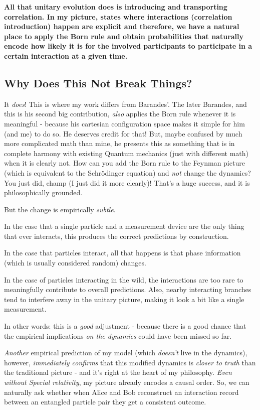 \documentclass{article}
\begin{document}
\textbf{All that unitary evolution does is introducing and transporting correlation. In my picture, states where interactions (correlation introduction) happen are explicit and therefore, we have a natural place to apply the Born rule and obtain probabilities that naturally encode how likely it is for the involved participants to participate in a certain interaction at a given time.}


\subsection{Why Does This Not Break Things?}

It \textit{does}! This is where my work differs from Barandes'. The later Barandes, and this is his second big contribution, \textit{also} applies the Born rule whenever it is meaningful - because his cartesian configuration space makes it simple for him (and me) to do so. He deserves credit for that! But, maybe confused by much more complicated math than mine, he presents this as something that is in complete harmony with existing Quantum mechanics (just with different math) when it is clearly not. How can you add the Born rule to the Feynman picture (which is equivalent to the Schrödinger equation) and \textit{not} change the dynamics? You just did, champ (I just did it more clearly)! That's a huge success, and it is philosophically grounded.

But the change is empirically \textit{subtle}.

In the case that a single particle and a measurement device are the only thing that ever interacts, this produces the correct predictions by construction.

In the case that particles interact, all that happens is that phase information (which is usually considered random) changes.

In the case of particles interacting in the wild, the interactions are too rare to meaningfully contribute to overall predictions. Also, nearby interacting branches tend to interfere away in the unitary picture, making it look a bit like a single measurement.

In other words: this is a \textit{good} adjustment - because there is a good chance that the empirical implications \textit{on the dynamics} could have been missed so far.

\textit{Another} empirical prediction of my model (which \textit{doesn't} live in the dynamics), however, \textit{immediately confirms} that this modified dynamics is \textit{closer to truth} than the traditional picture - and it's right at the heart of my philosophy. \textit{Even without Special relativity}, my picture already encodes a causal order. So, we can naturally ask whether when Alice and Bob reconstruct an interaction record between an entangled particle pair they get a consistent outcome.
\end{document}
